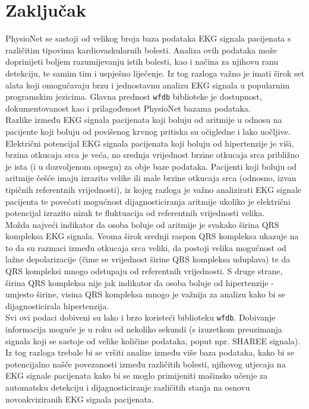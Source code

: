 \documentclass[12pt,a4paper]{article}
\begin{document}
\newpage

\section{Zaključak}

\quad PhysioNet se sastoji od velikog broja baza podataka EKG signala pacijenata s različitim tipovima kardiovaskularnih bolesti. Analiza ovih podataka može doprinijeti boljem razumijevanju istih bolesti, kao i načina za njihovu ranu detekciju, te samim tim i uspješno liječenje. Iz tog razloga važno je imati širok set alata koji omogućavaju brzu i jednostavnu analizu EKG signala u popularnim programskim jezicima. Glavna prednost \texttt{wfdb} biblioteke je dostupnost, dokumentovanost kao i prilagođenost PhysioNet bazama podataka. \\

Razlike između EKG signala pacijenata koji boluju od aritmije u odnosu na pacijente koji boluju od povišenog krvnog pritiska su očigledne i lako uočljive. Električni potencijal EKG signala pacijenata koji boluju od hipertenzije je viši, brzina otkucaja srca je veća, no srednja vrijednost brzine otkucaja srca približno je ista (i u dozvoljenom opsegu) za obje baze podataka. Pacijenti koji boluju od aritmije češće imaju izrazito velike ili male brzine otkucaja srca (odnosno, izvan tipičnih referentnih vrijednosti), iz kojeg razloga je važno analizirati EKG signale pacijenta te povećati mogućnost dijagnosticiranja aritmije ukoliko je električni potencijal izrazito nizak te fluktuacija od referentnih vrijednosti velika. \\

Možda najveći indikator da osoba boluje od aritmije je svakako širina QRS kompleksa EKG signala. Veoma širok srednji raspon QRS kompleksa ukazuje na to da su razmaci između otkucaja srca veliki, da postoji velika mogućnost od lažne depolarizacije (čime se vrijednost širine QRS kompleksa uduplava) te da QRS kompleksi mnogo odstupaju od referentnih vrijednosti. S druge strane, širina QRS kompleksa nije jak indikator da osoba boluje od hipertenzije - umjesto širine, visina QRS kompleksa mnogo je važnija za analizu kako bi se dijagnosticirala hipertenzija. \\

Svi ovi podaci dobiveni su lako i brzo koristeći biblioteku \texttt{wfdb}. Dobivanje informacija moguće je u roku od nekoliko sekundi (s izuzetkom preuzimanja signala koji se sastoje od velike količine podataka, poput npr. SHAREE signala). Iz tog razloga trebale bi se vršiti analize između više baza podataka, kako bi se potencijalno našče povezanosti između različitih bolesti, njihovog utjecaja na EKG signale pacijenata kako bi se moglo primijeniti mašinsko učenje za automatsku detekciju i dijagnosticiranje različitih stanja na osnovu novoakviziranih EKG signala pacijenata.

\newpage



\end{document}
